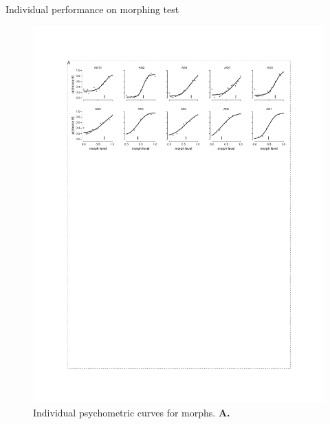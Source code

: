 Individual performance on morphing test
\begin{figure}[t!]
\includegraphics[width=\textwidth]{figures/supplemental/fig_s2_morphs_per_animal/fig_s2_morphs_per_animal.pdf}
    \vspace{.1in}
    \caption[Individual psychometric curves]{Individual psychometric curves for morphs. 
    \textbf{A.} 
    \label{supfig:morphs}}
\end{figure}

